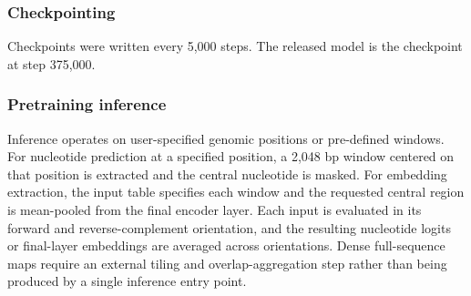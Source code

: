 \subsubsection*{Checkpointing}

Checkpoints were written every 5,000 steps. The released model is the
checkpoint at step 375,000.

\subsubsection*{Pretraining inference}

Inference operates on user-specified genomic positions or pre-defined
windows. For nucleotide prediction at a specified position, a 2,048 bp window
centered on that position is extracted and the central nucleotide is masked.
For embedding extraction, the input table specifies each window and the
requested central region is mean-pooled from the final encoder layer. Each
input is evaluated in its forward and reverse-complement orientation, and the
resulting nucleotide logits or final-layer embeddings are averaged across
orientations. Dense full-sequence maps require an external tiling and
overlap-aggregation step rather than being produced by a single inference
entry point.
